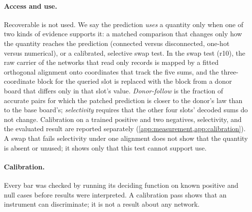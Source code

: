 \paragraph{Access and use.} Recoverable is not used. We say the prediction
\emph{uses} a quantity only when one of two kinds of evidence supports it: a
matched comparison that changes only how the quantity reaches the prediction
(connected versus disconnected, one-hot versus numerical), or a calibrated,
selective swap test. In the swap test (r10), the raw carrier of the
networks that read only records is mapped by a fitted orthogonal alignment onto
coordinates that track the five sums, and the three-coordinate block for the
queried slot is replaced with the block
from a donor board that differs only in that slot's value. \emph{Donor-follow} is the fraction
of accurate pairs for which the patched prediction is closer to the donor's
law than to the base board's; \emph{selectivity} requires that the other
four slots' decoded sums do not change. Calibration on a trained positive
and two negatives, selectivity, and the evaluated result are reported
separately (\cref{app:measurement,app:calibration}). A swap that fails
selectivity under one alignment does not show that the quantity is absent or
unused; it shows only that this test cannot support use.

\paragraph{Calibration.} Every bar was checked by running its deciding
function on known positive and null cases before results were interpreted.
A calibration pass shows that an instrument can discriminate; it is not a
result about any network.
